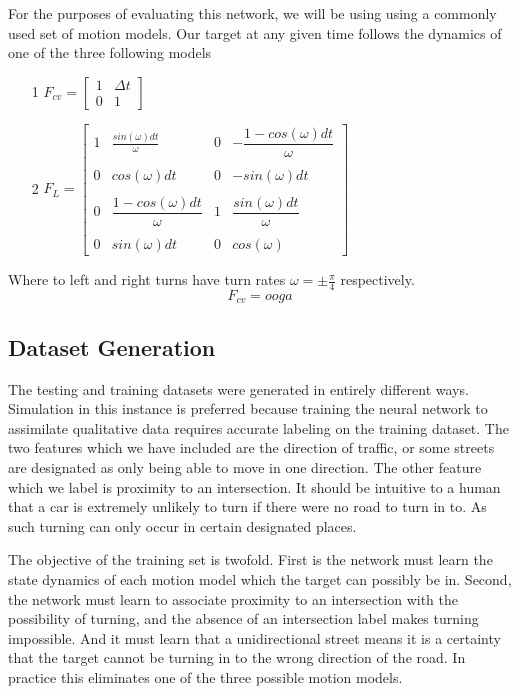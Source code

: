 \documentclass[twocolumn,letterpaper]{IEEEAerospaceCLS}  %
\begin{document}
For the purposes of evaluating this network, we will be using using a commonly used set of motion models. Our target at any given time follows the dynamics of one of the three following models
\begin{enumerate}
\item[1] $F_{cv} = \begin{bmatrix}
1 & \Delta t \\
0 & 1
\end{bmatrix}$
\item[2] $F_{L} = \begin{bmatrix}
1 & \tfrac{sin(\omega) dt}{\omega} & 0 & -\dfrac{1-cos(\omega)dt}{\omega} \\ \\
0 & cos(\omega) dt & 0 & -sin(\omega)dt \\ \\
0 & \dfrac{1-cos(\omega) dt}{\omega}& 1 & \dfrac{ sin(\omega)dt}{\omega} \\ \\
0 & sin(\omega)dt & 0 & cos(\omega)
\end{bmatrix}$ 
\end{enumerate}
Where to left and right turns have turn rates $\omega = \pm \frac{\pi}{4}$ respectively.
\begin{equation}
F_{cv} = ooga
\end{equation}



\subsection{Dataset Generation}
The testing and training datasets were generated in entirely different ways. Simulation in this instance is preferred because training the neural network to assimilate qualitative data requires accurate labeling on the training dataset. The two features which we have included are the direction of traffic, or some streets are designated as only being able to move in one direction. The other feature which we label is proximity to an intersection. It should be intuitive to a human that a car is extremely unlikely to turn if there were no road to turn in to. As such turning can only occur in certain designated places.

The objective of the training set is twofold. First is the network must learn the state dynamics of each motion model which the target can possibly be in. Second, the network must learn to associate proximity to an intersection with the possibility of turning, and the absence of an intersection label makes turning impossible. And it must learn that a unidirectional street means it is a certainty that the target cannot be turning in to the wrong direction of the road. In practice this eliminates one of the three possible motion models.
\end{document}
